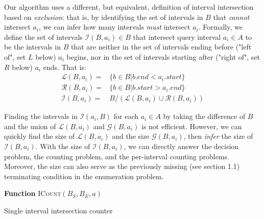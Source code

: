 \documentclass{bioinfo}
\begin{document}
	Our algorithm uses a different, but equivalent, definition of interval
	intersection based on \emph{exclusion}: that is, by identifying the set of 
	intervals in $B$ that \emph{cannot} intersect $a_i$, we can infer how many intervals
	\emph{must} intersect $a_i$. Formally, we define the set of intervals $\mathcal{I}(B,a_i) \in B$ that
	intersect query interval $a_i\in A$ to be the intervals in $B$ that
	are neither in the set of intervals ending before ("left of", set $L$ below) $a_i$ begins,
	nor in the set of intervals starting after ("right of", set $R$ below) $a_i$ ends.  That is:
	\begin{equation*}
		\begin{split}
			\mathcal{L}(B,a_i) = &\{b\in B| b.end < a_i.start\} \\
			\mathcal{R}(B,a_i) = &\{b\in B| b.start > a_i.end\} \\
			\mathcal{I}(B,a_i) = &B / (\mathcal{L}(B,a_i) \cup \mathcal{R}(B,a_i))
		\end{split}
	\end{equation*}

	Finding the intervals in $\mathcal{I}(a_i,B)$ for each $a_i\in A$ by
	taking the difference of $B$ and the union of $\mathcal{L}(B,a_i)$ and
	$\mathcal{G}(B,a_i)$ is not efficient.  However, we can quickly find
	the size of $\mathcal{L}(B,a_i)$ and the size $\mathcal{G}(B,a_i)$,
	then \emph{infer} the size of $\mathcal{I}(B,a_i)$.  With the size of
	$\mathcal{I}(B,a_i)$, we can directly answer the decision problem, the
	counting problem, and the per-interval counting problems.  Moreover,
	the size can also serve as the previously missing (see section 1.1) terminating
	condition in the enumeration problem.

	\begin{algorithm}[h]
		\DontPrintSemicolon
		\footnotesize
		\BlankLine
		\textbf{Function} \textsc{ICount}$(B_S,B_E,a)$
		\caption{Single interval intersection counter}
	\end{algorithm}
\end{document}
